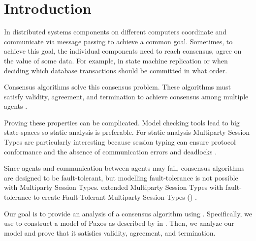 \chapter{Introduction}
In distributed systems components on different computers coordinate and communicate via message passing to achieve a common goal.
Sometimes, to achieve this goal, the individual components need to reach consensus, \ie agree on the value of some data.
For example, in state machine replication or when deciding which database transactions should be committed in what order.

Consensus algorithms solve this consensus problem.
These algorithms must satisfy validity, agreement, and termination to achieve consensus among multiple agents \cite{CoulourisEtal01}.

Proving these properties can be complicated.
Model checking tools lead to big state-spaces so static analysis is preferable.
For static analysis Multiparty Session Types are particularly interesting because session typing can ensure protocol conformance and the absence of communication errors and deadlocks \cite{ScalasEtal18}.

Since agents and communication between agents may fail, consensus algorithms are designed to be fault-tolerant, but modelling fault-tolerance is not possible with Multiparty Session Types.
\citeauthor{PetersEtal21} extended Multiparty Session Types with fault-tolerance to create Fault-Tolerant Multiparty Session Types (\FTMPST) \cite{PetersEtal21}.

Our goal is to provide an analysis of a consensus algorithm using \FTMPST.
Specifically, we use \FTMPST to construct a model of Paxos as described by \citeauthor{Lamport01} in \cite{Lamport01}.
Then, we analyze our model and prove that it satisfies validity, agreement, and termination.

